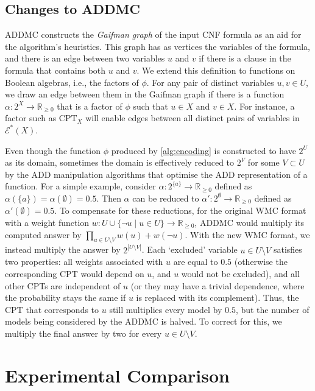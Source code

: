 \documentclass{article}
\theoremstyle{definition}
\theoremstyle{remark}
\begin{document}
{\subsection{Changes to ADDMC}

ADDMC constructs the \emph{Gaifman graph} \cite{gaifman1982local} of the input
CNF formula as an aid for the algorithm's heuristics. This graph has as vertices
the variables of the formula, and there is an edge between two variables $u$ and
$v$ if there is a clause in the formula that contains both $u$ and $v$. We
extend this definition to functions on Boolean algebras, i.e., the factors of
$\phi$. For any pair of distinct variables $u, v \in U$, we draw an edge between
them in the Gaifman graph if there is a function $\alpha\colon 2^X \to
\mathbb{R}_{\ge 0}$ that is a factor of $\phi$ such that $u \in X$ and $v \in
X$. For instance, a factor such as $\mathrm{CPT}_X$ will enable edges between
all distinct pairs of variables in $\mathcal{E}^*(X)$.

Even though the function $\phi$ produced by \cref{alg:encoding} is constructed
to have $2^U$ as its domain, sometimes the domain is effectively reduced to
$2^V$ for some $V \subset U$ by the ADD manipulation algorithms that optimise
the ADD representation of a function. For a simple example, consider $\alpha:
2^{\{a\}} \to \mathbb{R}_{\ge 0}$ defined as $\alpha(\{a\}) = \alpha(\emptyset)
= 0.5$. Then $\alpha$ can be reduced to $\alpha'\colon 2^{\emptyset} \to
\mathbb{R}_{\ge 0}$ defined as $\alpha'(\emptyset) = 0.5$. To compensate for
these reductions, for the original WMC format with a weight function $w\colon U
\cup \{ \neg u \mid u \in U \} \to \mathbb{R}_{\ge 0}$, ADDMC would multiply its
computed answer by $\prod_{u \in U \setminus V} w(u) + w(\neg u)$. With the new
WMC format, we instead multiply the answer by $2^{|U \setminus V|}$. Each
`excluded' variable $u \in U \setminus V$ satisfies two properties:
all weights associated with $u$ are equal to $0.5$ (otherwise the corresponding
CPT would depend on $u$, and $u$ would not be excluded), and all other CPTs are
independent of $u$ (or they may have a trivial dependence, where the probability
stays the same if $u$ is replaced with its complement).
Thus, the CPT that corresponds to $u$ still multiplies every model by $0.5$, but
the number of models being considered by the ADDMC is halved. To correct for
this, we multiply the final answer by two for every $u \in U \setminus V$.

\section{Experimental Comparison} \label{sec:experiments}

}
\end{document}
